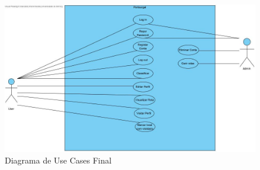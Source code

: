 \begin{figure}[H]
\centering
\includegraphics[width=0.9\linewidth]{images/usecases2.jpg}
\caption{Diagrama de Use Cases Final}
\label{fig:uc2}
\end{figure}
